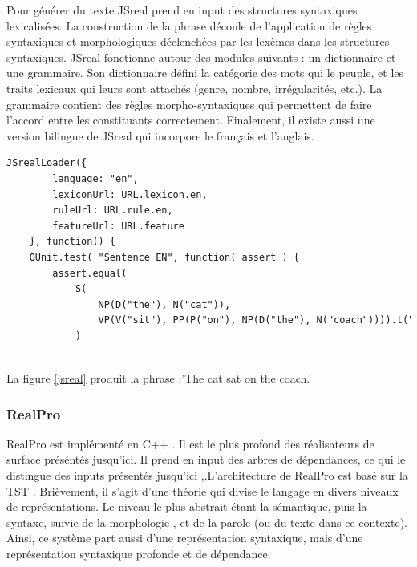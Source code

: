 Pour générer du texte JSreal prend en input des structures syntaxiques lexicalisées. La construction de la phrase découle de l'application de règles syntaxiques et morphologiques déclenchées par les lexèmes dans les structures syntaxiques. JSreal fonctionne autour des modules suivants : un dictionnaire et une grammaire. Son dictionnaire défini la catégorie des mots qui le peuple, et les traits lexicaux qui leurs sont attachés (genre, nombre, irrégularités, etc.). La grammaire contient des règles morpho-syntaxiques qui permettent de faire l'accord entre les constituants correctement. Finalement, il existe aussi une version bilingue de JSreal \citep{MolinsJSrealBBilingualText2015} qui incorpore le français et l'anglais.

\begin{lstlisting}[language=Xml, caption=JSreal, label=jsreal]
JSrealLoader({
        language: "en",
        lexiconUrl: URL.lexicon.en,
        ruleUrl: URL.rule.en,
        featureUrl: URL.feature
    }, function() {
    QUnit.test( "Sentence EN", function( assert ) {
        assert.equal(
            S(
                NP(D("the"), N("cat")),
                VP(V("sit"), PP(P("on"), NP(D("the"), N("coach")))).t("ps")
            )
        
\end{lstlisting}
La figure \ref{jsreal} produit la phrase :'The cat sat on the coach.'
		
\subsubsection{RealPro}
RealPro est implémenté en C++ \citep{LavoieFastPortableRealizer1997}. Il est le plus profond des réalisateurs de surface préséntés jusqu'ici. Il prend en input des arbres de dépendances, ce qui le distingue des inputs présentés jusqu'ici \citep{DaoustJSREALTextRealizer2015},\citep{GattSimpleNLGRealisationEngine2009}.L'architecture de RealPro est basé sur la TST \citep{melcuk1988}. Brièvement, il s'agit d'une théorie qui divise le langage en divers niveaux de représentations. Le niveau le plus abstrait étant la sémantique, puis la syntaxe,  suivie de la morphologie , et de la parole (ou du texte dans ce contexte). Ainsi, ce système part aussi d'une représentation syntaxique, mais d'une représentation syntaxique profonde et de dépendance. 

